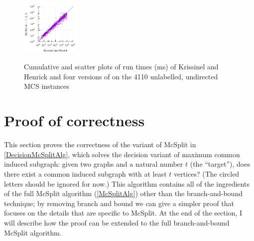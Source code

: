 \begin{figure}[h!]
{        \includegraphics*[width=0.25\textwidth]{14-mcsplit-i-undirected/krissinel/mcs-instances-experiment/plots/kh-vs-mcsplit-3}
        \label{figure:kh-plain-cumulative}
    }
    \caption{Cumulative and scatter plots of run times (ms) of Krissinel and Henrick \cite{DBLP:journals/spe/KrissinelH04}
            and four versions of \McSplit on the 4110 unlabelled, undirected MCS instances}\label{fig:mcsplit-vs-kh}
\end{figure}

\section{Proof of correctness}

This section proves the correctness of the variant of McSplit in \cref{DecisionMcSplitAlg}, which solves
the decision variant of maximum common induced subgraph: given two graphs and a natural number
$t$ (the ``target''), does there exist a common induced subgraph with at least $t$ vertices?
(The circled letters should be ignored for now.)
This algorithm contains all of the ingredients of the full McSplit algorithm (\cref{McSplitAlg})
other than the branch-and-bound technique; by removing branch and bound we can give a simpler
proof that focuses on the details that are specific to McSplit.  At the end of the section,
I will describe how the proof can be extended to the full branch-and-bound McSplit algorithm.

